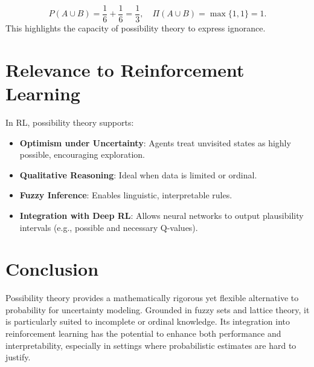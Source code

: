 \documentclass[14pt]{article}
\begin{document}
\[
P(A \cup B) = \frac{1}{6} + \frac{1}{6} = \frac{1}{3}, \quad \Pi(A \cup B) = \max\{1, 1\} = 1.
\]
This highlights the capacity of possibility theory to express ignorance.

\section{Relevance to Reinforcement Learning}

In RL, possibility theory supports:
\begin{itemize}
    \item \textbf{Optimism under Uncertainty}: Agents treat unvisited states as highly possible, encouraging exploration.
    \item \textbf{Qualitative Reasoning}: Ideal when data is limited or ordinal.
    \item \textbf{Fuzzy Inference}: Enables linguistic, interpretable rules.
    \item \textbf{Integration with Deep RL}: Allows neural networks to output plausibility intervals (e.g., possible and necessary Q-values).
\end{itemize}

\section{Conclusion}

Possibility theory provides a mathematically rigorous yet flexible alternative to probability for uncertainty modeling. Grounded in fuzzy sets and lattice theory, it is particularly suited to incomplete or ordinal knowledge. Its integration into reinforcement learning has the potential to enhance both performance and interpretability, especially in settings where probabilistic estimates are hard to justify.
\end{document}
